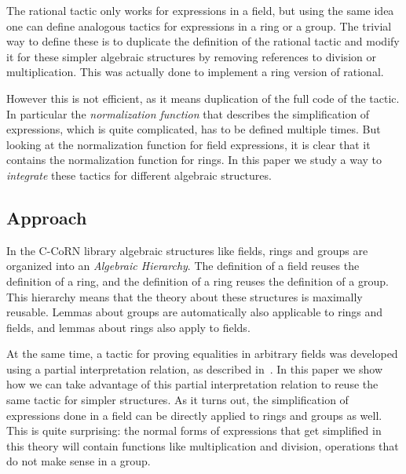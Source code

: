 \documentclass[runningheads]{llncs}
\newcommand{\tacticname}[1]{\textsf{#1}}
\newcommand{\rational}{\tacticname{rational}}
\begin{document}
The {\rational} tactic only works for expressions in a field,
but using the same idea one can define
analogous tactics for expressions in a ring or a group.
The trivial way to define these is to duplicate the definition of the
{\rational} tactic and modify it for these simpler algebraic structures
by removing references to division or multiplication.
This was actually done to implement a ring version of {\rational}.

However this is not efficient, as it means duplication of the full
code of the tactic.
In particular the \emph{normalization function} that describes the simplification
of expressions, which is quite complicated, has to be defined multiple
times.
But looking at the normalization function for field expressions, it
is clear that it contains the normalization function for rings.
In this paper we study a way to \emph{integrate} these tactics for
different algebraic structures.

\subsection{Approach}

In the C-CoRN library algebraic structures like fields, rings
and groups are organized into an \emph{Algebraic Hierarchy}.
The definition of a field reuses the definition of a ring, and
the definition of a ring reuses the definition of a group.
This hierarchy means that the theory about these structures
is maximally reusable.
Lemmas about groups are automatically also applicable to rings
and fields, and lemmas about rings also apply to fields.

At the same time, a tactic for proving equalities in arbitrary fields
was developed using a partial interpretation relation, as described
in~\cite{geu:wie:zwa:00}.
In this paper we show how we
can take advantage of this partial interpretation relation to reuse the
same tactic for simpler structures.
As it turns out, the simplification of expressions done in a field
can be directly applied to rings and groups as well.
This is quite surprising:
the normal forms of expressions that get simplified in this theory
will contain functions like multiplication and division,
operations that do not make sense in a group.
\end{document}
